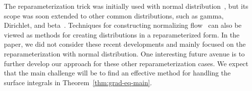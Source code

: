 The reparameterization trick was initially used with normal distribution~\cite{KingmaICLR14,RezendeICML14}, but its scope was soon extended to other common distributions, such as gamma, Dirichlet, and beta~\cite{Knowles15stochastic,RuizNIPS16,NaessethAISTATS17}. Techniques for constructing normalizing flow~\cite{RezendeICML15,KingmaNIPS16} can also be viewed as methods for creating distributions in a reparameterized form. In the paper, we did not consider these recent developments and mainly focused on the reparameterization with normal distribution. One interesting future avenue is to further develop our approach for these other reparameterization cases. We expect that the main challenge will be to find an effective method for handling the surface integrals in Theorem~\ref{thm:grad-eq-main}.

